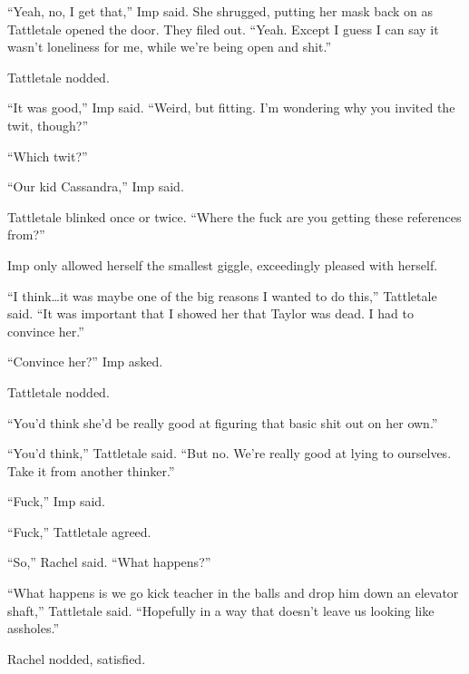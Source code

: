 ``Yeah, no, I get that,'' Imp said.  She shrugged, putting her mask back on as Tattletale opened the door.  They filed out.  ``Yeah.  Except I guess I can say it wasn't loneliness for me, while we're being open and shit.''



Tattletale nodded.



``It was good,'' Imp said.  ``Weird, but fitting.  I'm wondering why you invited the twit, though?''



``Which twit?''



``Our kid Cassandra,'' Imp said.



Tattletale blinked once or twice.  ``Where the fuck are you getting these references from?''



Imp only allowed herself the smallest giggle, exceedingly pleased with herself.



``I think\ldots it was maybe one of the big reasons I wanted to do this,'' Tattletale said.  ``It was important that I showed her that Taylor was dead.  I had to convince her.''



``Convince her?''  Imp asked.



Tattletale nodded.



``You'd think she'd be really good at figuring that basic shit out on her own.''



``You'd think,'' Tattletale said.  ``But no.  We're really good at lying to ourselves.  Take it from another thinker.''



``Fuck,'' Imp said.



``Fuck,'' Tattletale agreed.



``So,'' Rachel said.  ``What happens?''



``What happens is we go kick teacher in the balls and drop him down an elevator shaft,'' Tattletale said.  ``Hopefully in a way that doesn't leave us looking like assholes.''



Rachel nodded, satisfied.



